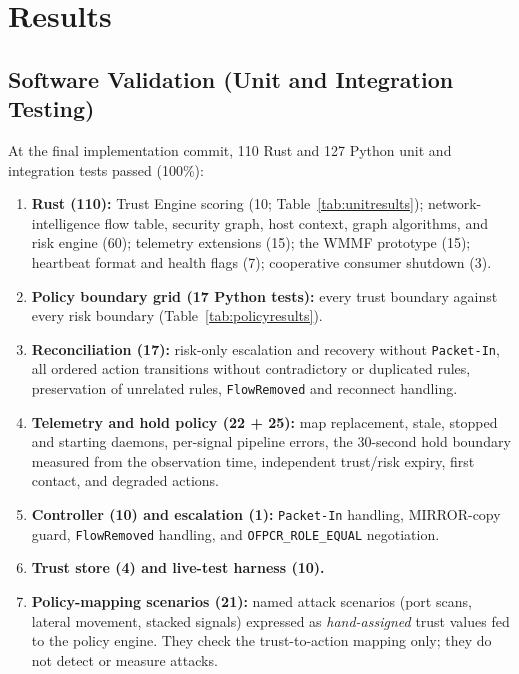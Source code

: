 \documentclass[conference]{IEEEtran}
\begin{document}

\section{Results}

\subsection{Software Validation (Unit and Integration Testing)}
At the final implementation commit, 110 Rust and 127 Python unit and integration tests passed (100\%):

\begin{enumerate}
\item \textbf{Rust (110):} Trust Engine scoring (10; Table~\ref{tab:unitresults}); network-intelligence flow table, security graph, host context, graph algorithms, and risk engine (60); telemetry extensions (15); the WMMF prototype (15); heartbeat format and health flags (7); cooperative consumer shutdown (3).
\item \textbf{Policy boundary grid (17 Python tests):} every trust boundary against every risk boundary (Table~\ref{tab:policyresults}).
\item \textbf{Reconciliation (17):} risk-only escalation and recovery without \texttt{Packet-In}, all ordered action transitions without contradictory or duplicated rules, preservation of unrelated rules, \texttt{FlowRemoved} and reconnect handling.
\item \textbf{Telemetry and hold policy (22 + 25):} map replacement, stale, stopped and starting daemons, per-signal pipeline errors, the 30-second hold boundary measured from the observation time, independent trust/risk expiry, first contact, and degraded actions.
\item \textbf{Controller (10) and escalation (1):} \texttt{Packet-In} handling, MIRROR-copy guard, \texttt{FlowRemoved} handling, and \texttt{OFPCR\_ROLE\_EQUAL} negotiation.
\item \textbf{Trust store (4) and live-test harness (10).}
\item \textbf{Policy-mapping scenarios (21):} named attack scenarios (port scans, lateral movement, stacked signals) expressed as \emph{hand-assigned} trust values fed to the policy engine. They check the trust-to-action mapping only; they do not detect or measure attacks.
\end{enumerate}
\end{document}
